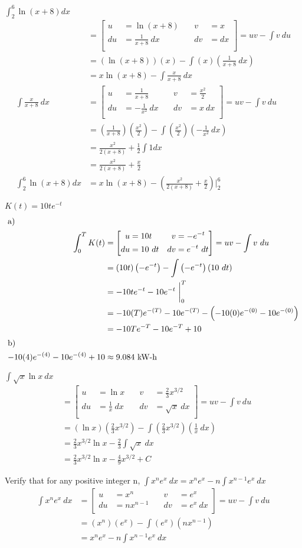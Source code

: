 \documentclass[12pt]{article}
\newenvironment{problem}[2][]{
    \begin{trivlist}
        \item[
            {\bfseries #1}
            {\bfseries #2.}
        ]
}{\end{trivlist}}
\newcommand{\setuv}[4]{
\left[
\begin{alignedat}{2}
u &= #1 &\quad v &= #2 \\
du &= #3 &\quad dv &= #4 \\
\end{alignedat}
\right]  = uv - \int v ~ du \\
&= \intbp{#1}{#2}{#3}
}
\newcommand{\intbp}[3]{\left(#1\right) \left(#2\right) - \int \left(#2\right) \left(#3\right)}
\begin{document}
\begin{problem}{33}
$\displaystyle\int_2^6 \ln \left(x + 8\right) dx$
\begin{align}
&= \setuv{\ln \left(x + 8\right)}{x}{\frac{1}{x + 8} ~ dx}{dx} \\
&= x \ln \left(x + 8\right) - \int \frac{x}{x + 8} ~ dx \\
\int \frac{x}{x+8} ~ dx &= \setuv{\frac{1}{x + 8}}{\frac{x^2}{2}}{-\frac{1}{x^2} ~ dx}{x ~ dx} \\
&= \frac{x^2}{2 \left(x + 8\right)} + \frac{1}{2} \int 1 dx \\
&= \frac{x^2}{2 \left(x + 8\right)} + \frac{x}{2} \\
\int_2^6 \ln \left(x + 8\right) dx &= x \ln \left(x + 8\right) - \left(\frac{x^2}{2 \left(x + 8\right)} + \frac{x}{2}\right) \bigg|_2^6
\end{align}
\end{problem}

\begin{problem}{39}
$K(t) = 10te^{-t}$
\begin{align}
\shortintertext{a)}
\int_0^T K(t) &= \setuv{10t}{-e^{-t}}{10 ~ dt}{e^{-t} ~ dt} \\
&= -10te^{-t} - 10e^{-t} ~ \bigg|_0^{T} \\
&= -10(T)e^{-(T)} - 10e^{-(T)} - \left(-10(0)e^{-(0)} - 10e^{-(0)}\right) \\
&= -10Te^{-T} - 10e^{-T} + 10 \\
\shortintertext{b)}
-10(4)e^{-(4)} - 10e^{-(4)} + 10 &\approx 9.084 ~ \text{kW-h}
\end{align}
\end{problem}

\begin{problem}{41}
$\displaystyle\int \sqrt{x} \ln x ~ dx$
\begin{align}
&= \setuv{\ln x}{\frac{2}{3} x^{3/2}}{\frac{1}{x} ~ dx}{\sqrt{x} ~ dx} \\
&= \frac{2}{3} x^{3/2} \ln x - \frac{2}{3} \int \sqrt{x} ~ dx \\
&= \frac{2}{3} x^{3/2} \ln x - \frac{4}{9} x^{3/2} + C
\end{align}
\end{problem}

\begin{problem}{49}
Verify that for any positive integer n, $\displaystyle\int x^ne^x ~ dx = x^ne^x - n \displaystyle\int x^{n - 1}e^x ~ dx$
\begin{align}
\int x^ne^x ~ dx &= \setuv{x^n}{e^x}{nx^{n - 1}}{e^x ~ dx} \\
&= x^ne^x - n \int x^{n - 1}e^x ~ dx
\end{align}
\end{problem}
\end{document}
